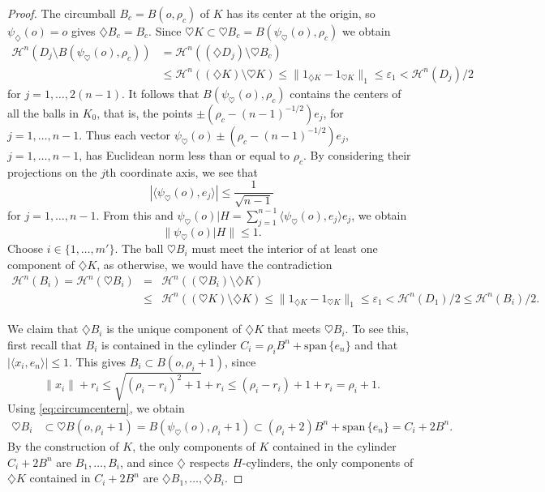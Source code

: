 \documentclass[12pt,reqno]{amsart}
\newcommand{\ee}{\varepsilon}
\newcommand{\cH}{{\mathcal H}}
\newcommand{\myspan}{{\mathrm{span}}\,}
\newcommand{\di}{\diamondsuit}
\numberwithin{equation}{section}
\begin{document}
\begin{proof}
The circumball $B_c=B(o,\rho_c)$ of $K$ has its center at the origin, so $\psi_\di(o)=o$ gives $\di B_c=B_c$. Since $\heartsuit K\subset \heartsuit B_c=B(\psi_{\heartsuit}(o),\rho_c)$ we obtain
\begin{align*}
\cH^n\left(D_j\setminus B(\psi_{\heartsuit}(o),\rho_c)\right)
&=\cH^n\left((\di D_j)\setminus \heartsuit B_c\right)\\
&\le \cH^n((\di K)\setminus \heartsuit K)\le \|1_{\di K}-1_{\heartsuit K}\|_1\le \ee_1<{\cH}^n(D_j)/2
\end{align*}
for $j=1,\dots,2(n-1)$.  It follows that $B(\psi_{\heartsuit}(o),\rho_c)$ contains the centers of all the balls in $K_0$, that is, the points $\pm (\rho_c-(n-1)^{-1/2}) e_j$, for $j=1,\dots,n-1$.  Thus each vector $\psi_{\heartsuit}(o)\pm (\rho_c-(n-1)^{-1/2}) e_j$, $j=1,\dots,n-1$, has Euclidean norm less than or equal to $\rho_c$.  By considering their projections on the $j$th coordinate axis, we see that
$$|\langle \psi_{\heartsuit}(o), e_j\rangle|\le \frac1{\sqrt{n-1}}$$
for $j=1,\dots,n-1$.  From this and $\psi_{\heartsuit}(o)|H=\sum_{j=1}^{n-1}\langle \psi_{\heartsuit}(o),e_j\rangle e_j$, we obtain
\begin{equation}\label{eq:circumcentern}
\|\psi_{\heartsuit}(o)|H\|\le 1.
\end{equation}
Choose $i\in \{1,\ldots, m'\}$. The ball $\heartsuit B_i$ must meet the interior of at least one component of $\di K$, as otherwise, we would have the contradiction
\begin{eqnarray*}
{\cH}^n(B_i) = {\cH}^n(\heartsuit B_i)&=&\cH^n\left( (\heartsuit B_i)\setminus \di K\right)\\
&\le& \cH^n\left( (\heartsuit K)\setminus \di K\right)
\le \|1_{\di K}-1_{\heartsuit K}\|_1\le
\ee_1< {\cH}^n(D_1)/2\le {\cH}^n(B_i)/2.
\end{eqnarray*}

We claim that $\di B_i$ is the unique component of $\di K$ that meets $\heartsuit B_i$. To see this, first recall that $B_i$ is contained in the cylinder $C_i=\rho_i B^n+\myspan\{e_n\}$ and that $|\langle x_i,e_n\rangle|\le 1$. This gives $B_i\subset B(o,\rho_i+1)$, since
\[
\|x_i\|+r_i\le \sqrt{(\rho_i-r_i)^2+1}+r_i\le (\rho_i-r_i)+1+r_i=\rho_i+1.
\]
Using \eqref{eq:circumcentern}, we obtain
\begin{align*}
\heartsuit B_i&\subset
\heartsuit B\left(o,\rho_i+1\right)
=B\left(\psi_{\heartsuit}(o),\rho_i+1\right)\subset
(\rho_i+2) B^n+\myspan\{e_n\}=C_i+2B^n.
\end{align*}
By the construction of $K$, the only components of $K$ contained in the cylinder $C_i+2B^n$ are $B_1,\ldots,B_i$, and since $\di$ respects $H$-cylinders, the only components of $\di K$ contained in  $C_i+2B^n$ are  $\di B_1,\ldots,\di B_i$.


\end{proof}
\end{document}
